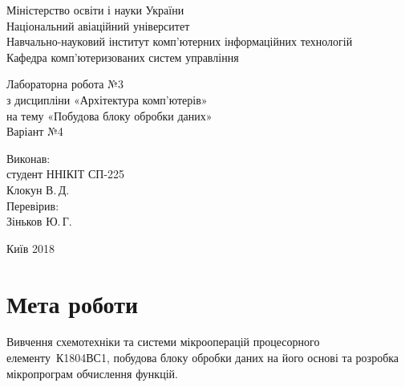 \documentclass[a4paper,oneside,DIV=12,12pt,headings=normal]{scrartcl}
\begin{document}
	\begin{titlepage}
	\centering
		Міністерство освіти і науки України\\
		Національний авіаційний університет\\
		Навчально-науковий інститут комп'ютерних інформаційних технологій\\
		Кафедра комп'ютеризованих систем управління

		\vspace*{\fill}

		Лабораторна робота №3\\
		з дисципліни «Архітектура комп'ютерів»\\
		на тему «Побудова блоку обробки даних»\\
		Варіант №4

		\vspace*{\fill}
		
		\begin{flushright}
			Виконав:\\
			студент ННІКІТ СП-225\\
			Клокун В.\,Д.\\
			Перевірив:\\
			Зіньков Ю.\,Г.
		\end{flushright}

		Київ 2018
    \end{titlepage}
	
	\section{Мета роботи}
		Вивчення схемотехніки та системи мікрооперацій процесорного елементу~К1804ВС1, побудова блоку обробки даних на його основі та розробка мікропрограм обчислення функцій.
		
\end{document}
